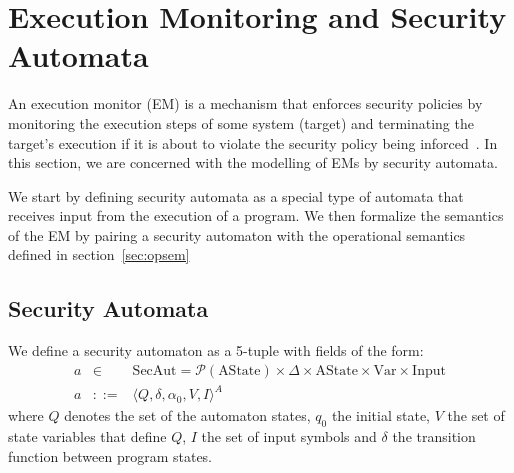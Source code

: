 \documentclass[10pt,notitlepage,twoside]{article}
\newcommand{\aut}{a}
\newcommand{\automata}[5]{\langle #1,#2,#3,#4,#5 \rangle^A}
\newcommand{\qu}{\alpha}
\newcommand{\theautomaton}{\automata{Q}{\delta}{\qu_0}{V}{I}}
\begin{document}
\section{Execution Monitoring and Security Automata}\label{sec:em}


An execution monitor (EM) is a mechanism that enforces security policies by monitoring the execution steps of some system (target) and terminating the target's execution if it is about to violate the security policy being inforced~\cite{Schneider2000}.
In this section, we are concerned with the modelling of EMs by security automata.

We start by defining security automata as a special type of automata that receives input from the execution of a program. We then formalize the semantics of the EM by pairing a security automaton with the operational semantics defined in section~\ref{sec:opsem}

\subsection{Security Automata}\label{sec:automata}


We define a security automaton as a 5-tuple with fields of the form:
\begin{displaymath}
\begin{array}{rcl}
\aut & \in & \textrm{SecAut} = \mathcal{P}(\textrm{AState}) \times \Delta \times \textrm{AState} \times \textrm{Var} \times \textrm{Input}  \\
\aut & ::= & \theautomaton
\end{array}
\end{displaymath}
where $Q$ denotes the set of the automaton states, $q_0$ the initial state, $V$ the set of state variables that define $Q$, $I$ the set of input symbols and $\delta$ the transition function between program states.
\end{document}
